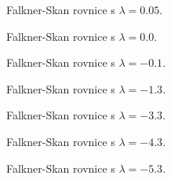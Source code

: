 \begin{figure}[h]
	\centering
	\def\svgwidth{\textwidth}
	
	\caption{Falkner-Skan rovnice s $\lambda = 0.05$.}
\end{figure}

\begin{figure}[h]
	\centering
	\def\svgwidth{\textwidth}
	
	\caption{Falkner-Skan rovnice s $\lambda = 0.0$.}
\end{figure}

\begin{figure}[h]
	\centering
	\def\svgwidth{\textwidth}
	
	\caption{Falkner-Skan rovnice s $\lambda = -0.1$.}
\end{figure}

\begin{figure}[h]
	\centering
	\def\svgwidth{\textwidth}
	
	\caption{Falkner-Skan rovnice s $\lambda = -1.3$.}
\end{figure}

\begin{figure}[h]
	\centering
	\def\svgwidth{\textwidth}
	
	\caption{Falkner-Skan rovnice s $\lambda = -3.3$.}
\end{figure}

\begin{figure}[h]
	\centering
	\def\svgwidth{\textwidth}
	
	\caption{Falkner-Skan rovnice s $\lambda = -4.3$.}
\end{figure}

\begin{figure}[h]
	\centering
	\def\svgwidth{\textwidth}
	
	\caption{Falkner-Skan rovnice s $\lambda = -5.3$.}
\end{figure}
